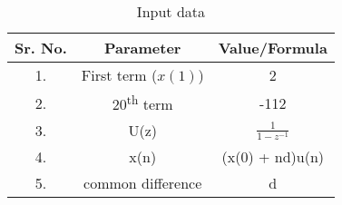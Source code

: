 \begin{table}[h]
    \centering
    \begin{tabular}{|c|c|c|}
        \hline
        \textbf{Sr. No.} & \textbf{Parameter} & \textbf{Value/Formula} \\
        \hline
        1. & First term (\(x(1)\)) & 2 \\
        \hline
        2. & 20\textsuperscript{th} term & -112\\
        \hline
        3. & U(z) & $\frac{1}{1-z^{-1}}$\\
        \hline
        4. & x(n) & (x(0) + nd)u(n)\\
        \hline
        5. & common difference & d\\
        \hline
    \end{tabular}
    \caption{Input data}
  \label{input data}
\end{table}
